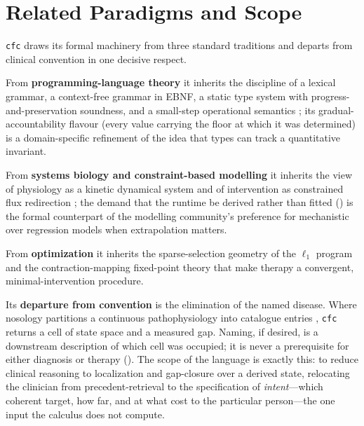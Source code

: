 \documentclass[11pt,a4paper]{article}
\theoremstyle{cfcthm}
\theoremstyle{definition}
\theoremstyle{remark}
\newcommand{\cf}[1]{\texttt{#1}}
\begin{document}
\section{Related Paradigms and Scope}
\label{sec:related}

\cf{cfc} draws its formal machinery from three standard traditions and departs
from clinical convention in one decisive respect.

From \textbf{programming-language theory} it inherits the discipline of a
lexical grammar, a context-free grammar in EBNF, a static type system with
progress-and-preservation soundness, and a small-step operational semantics
\citep{aho2006compilers,pierce2002types,wright1994syntactic,plotkin2004structural};
its gradual-accountability flavour (every value carrying the floor at which it
was determined) is a domain-specific refinement of the idea that types can
track a quantitative invariant.

From \textbf{systems biology and constraint-based modelling} it inherits the
view of physiology as a kinetic dynamical system and of intervention as
constrained flux redirection \citep{kitano2002systems,palsson2015systems,%
orth2010fba}; the demand that the runtime be derived rather than fitted
() is the formal counterpart of the modelling community's
preference for mechanistic over regression models when extrapolation matters.

From \textbf{optimization} it inherits the sparse-selection geometry of the
$\ell_1$ program \citep{tibshirani1996lasso,candes2006robust,boyd2004convex} and
the contraction-mapping fixed-point theory \citep{banach1922} that make therapy
a convergent, minimal-intervention procedure.

Its \textbf{departure from convention} is the elimination of the named disease.
Where nosology partitions a continuous pathophysiology into catalogue entries
\citep{feinstein1967clinical,scheuermann2009toward,loscalzo2007network},
\cf{cfc} returns a cell of state space and a measured gap. Naming, if desired,
is a downstream description of which cell was occupied; it is never a
prerequisite for either diagnosis or therapy (). The
scope of the language is exactly this: to reduce clinical reasoning to
localization and gap-closure over a derived state, relocating the clinician from
precedent-retrieval to the specification of \emph{intent}---which coherent
target, how far, and at what cost to the particular person---the one input the
calculus does not compute.
\end{document}
